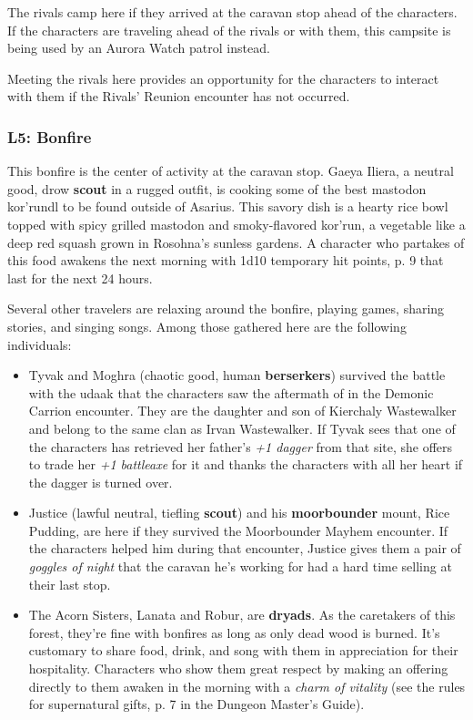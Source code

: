 \documentclass[letterpaper, 11pt, bg=full, twocolumn]{dndbook}
\begin{document}
The rivals camp here if they arrived at the caravan stop ahead of the characters. If the characters are traveling ahead of the rivals or with them, this campsite is being used by an Aurora Watch patrol instead.

Meeting the rivals here provides an opportunity for the characters to interact with them if the Rivals' Reunion encounter has not occurred.

\subsubsection{L5: Bonfire}

This bonfire is the center of activity at the caravan stop. Gaeya Iliera, a neutral good, drow \textbf{scout} in a rugged outfit, is cooking some of the best mastodon kor'rundl to be found outside of Asarius. This savory dish is a hearty rice bowl topped with spicy grilled mastodon and smoky-flavored kor'run, a vegetable like a deep red squash grown in Rosohna's sunless gardens. A character who partakes of this food awakens the next morning with 1d10 temporary hit points, p. 9 that last for the next 24 hours.

Several other travelers are relaxing around the bonfire, playing games, sharing stories, and singing songs. Among those gathered here are the following individuals:

\begin{itemize}
\item Tyvak and Moghra (chaotic good, human \textbf{berserkers}) survived the battle with the udaak that the characters saw the aftermath of in the Demonic Carrion encounter. They are the daughter and son of Kierchaly Wastewalker and belong to the same clan as Irvan Wastewalker. If Tyvak sees that one of the characters has retrieved her father's \textit{+1 dagger} from that site, she offers to trade her \textit{+1 battleaxe} for it and thanks the characters with all her heart if the dagger is turned over.
\item Justice (lawful neutral, tiefling \textbf{scout}) and his \textbf{moorbounder} mount, Rice Pudding, are here if they survived the Moorbounder Mayhem encounter. If the characters helped him during that encounter, Justice gives them a pair of \textit{goggles of night} that the caravan he's working for had a hard time selling at their last stop.
\item The Acorn Sisters, Lanata and Robur, are \textbf{dryads}. As the caretakers of this forest, they're fine with bonfires as long as only dead wood is burned. It's customary to share food, drink, and song with them in appreciation for their hospitality. Characters who show them great respect by making an offering directly to them awaken in the morning with a \textit{charm of vitality} (see the rules for supernatural gifts, p. 7 in the Dungeon Master's Guide).
\end{itemize}
\end{document}

